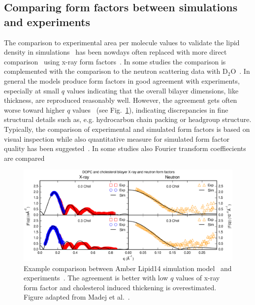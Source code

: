 \documentclass[aps,prl,superscriptaddress,twocolumn]{revtex4}
\begin{document}

\subsection{Comparing form factors between simulations and experiments}

The comparison to experimental area per molecule values to validate the lipid density in simulations~\cite{tieleman97} has
been nowdays often replaced with more direct comparison~\cite{nagle00} using x-ray form 
factors~\cite{hogberg08,chiu09,klauda10,dickson12,jambeck12,lim12,klauda12,jambeck13,chowdhary13,lee14,maciejewski14,dickson14,tjornhammar14,madej15,kulig15b}.
In some studies the comparison is complemented with the comparison to the neutron scattering 
data with D$_2$O~\cite{dickson12,jambeck12,lee14,dickson14,tjornhammar14,madej15}.
In general the models produce form factors in good agreement with experiments, especially at small $q$ values indicating 
that the overall bilayer dimensions, like thickness, are reproduced reasonably well. However, the agreement gets often worse
toward higher $q$ 
values~\cite{chiu09,klauda10,klauda12,dickson12,lim12,jambeck12,chowdhary13,jambeck13,lee14,maciejewski14,dickson14,kulig15b,madej15}
(see Fig.~\ref{FFcomp}), indicating discrepancies in fine structural details such as, e.g. hydrocarbon chain packing or headgroup structure.
Typically, the comparison of experimental and simulated form factors is based on visual inspection while also quantitative measure
for simulated form factor quality has been suggested~\cite{kucerka10}. In some studies also Fourier transform coeffiecients are
compared~\cite{benz05}
\begin{figure}[]
  \includegraphics[width=17.2cm]{../Fig/FFcompMADEJ.eps}
\newline
  \caption{\label{FFcomp}
    Example comparison between Amber Lipid14 simulation model~\cite{madej15} and experiments~\cite{pan09,kucerka07b}.
    The agreement is better with low $q$ values of x-ray form factor and cholesterol induced thickening is overestimated.
    Figure adapted from Madej et al.~\cite{madej15}.
  } 
\end{figure}
\end{document}
